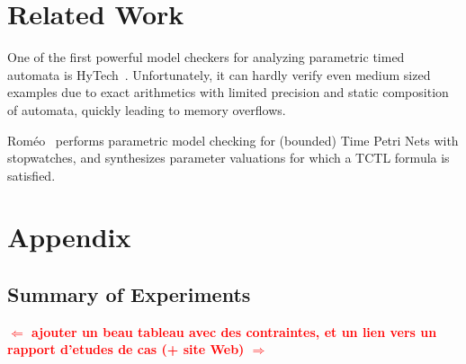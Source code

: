 \documentclass{llncs}
\newcommand{\hytech}{{\sc HyTech}}
\newcommand{\romeo}{Rom\'eo}
\newcommand{\commentaire}[1]{\textcolor{red}{\textbf{$\Leftarrow$  #1 $\Rightarrow$}}}
\begin{document}
\section{Related Work}


One of the first powerful model checkers for analyzing parametric timed automata is \hytech{}~\cite{hhw97}.
Unfortunately, it can hardly verify even medium sized examples due to exact arithmetics with limited precision and static composition of automata, quickly leading to memory overflows.

\romeo{}~\cite{lrst09} performs parametric model checking for (bounded) Time Petri Nets with stopwatches, and synthesizes parameter valuations for which a TCTL formula is satisfied.









\newpage


\appendix

\section*{Appendix}

\subsection*{Summary of Experiments}

\commentaire{ajouter un beau tableau avec des contraintes, et un lien vers un rapport d'etudes de cas (+ site Web)}
\end{document}
